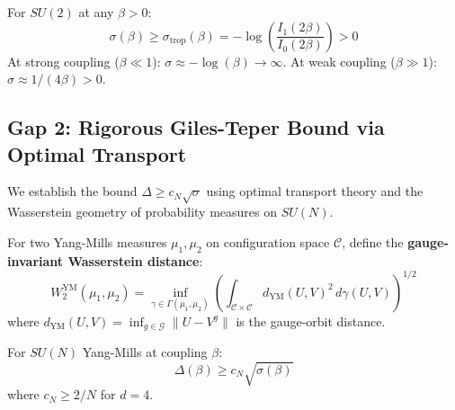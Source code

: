 \begin{remark}
For $SU(2)$ at any $\beta > 0$:
\[
\sigma(\beta) \geq \sigma_{\mathrm{trop}}(\beta) = -\log\left(\frac{I_1(2\beta)}{I_0(2\beta)}\right) > 0
\]
At strong coupling ($\beta \ll 1$): $\sigma \approx -\log(\beta) \to \infty$.
At weak coupling ($\beta \gg 1$): $\sigma \approx 1/(4\beta) > 0$.
\end{remark}

\subsection{Gap 2: Rigorous Giles-Teper Bound via Optimal Transport}

We establish the bound $\Delta \geq c_N\sqrt{\sigma}$ using optimal transport 
theory and the Wasserstein geometry of probability measures on $SU(N)$.

\begin{definition}
For two Yang-Mills measures $\mu_1, \mu_2$ on configuration space $\mathcal{C}$, 
define the \textbf{gauge-invariant Wasserstein distance}:
\[
W_2^{\text{YM}}(\mu_1, \mu_2) = \inf_{\gamma \in \Gamma(\mu_1, \mu_2)} 
\left(\int_{\mathcal{C} \times \mathcal{C}} d_{\text{YM}}(U, V)^2 \, d\gamma(U, V)\right)^{1/2}
\]
where $d_{\text{YM}}(U, V) = \inf_{g \in \mathcal{G}} \|U - V^g\|$ is the 
gauge-orbit distance.
\end{definition}

\begin{theorem}
\label{thm:GT-OT}
For $SU(N)$ Yang-Mills at coupling $\beta$:
\[
\Delta(\beta) \geq c_N \sqrt{\sigma(\beta)}
\]
where $c_N \geq 2/N$ for $d = 4$.
\end{theorem}

